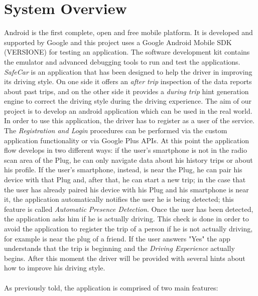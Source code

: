 \chapter{System Overview} \label{chap2}
Android is the first complete, open and free mobile platform. It is developed and supported by Google and this project uses a Google Android Mobile SDK (VERSIONE) for testing an application. The software development kit contains the emulator and advanced debugging tools to run and test the applications.\\
\textit{SafeCar} is an application that has been designed to help the driver in improving its driving style. On one side it offers an \textit{after trip} inspection of the data reports about past trips, and on the other side it provides a \textit{during trip} hint generation engine to correct the driving style during the driving experience.
The aim of our project is to develop an android application which can be used in the real world.\\
In order to use this application, the driver has to register as a user of the service. The \textit{Registration and Login} procedures can be performed via the custom application functionality or via Google Plus APIs.
At this point the application flow develops in two different ways: if the user's smartphone is not in the radio scan area of the Plug, he can only navigate data about his history trips or about his profile. If the user's smartphone, instead,  is near the Plug, he can pair his device with that Plug and, after that, he can start a new trip; in the case that the user has already paired his device with his Plug and his smartphone is near it, the application automatically notifies the user he is being detected; this feature is called \textit{Automatic Presence Detection}. Once the user has been detected, the application asks him if he is actually driving. This check is done in order to avoid the application to register the trip of a person if he is not actually driving, for example is near the plug of a friend. If the user answers "Yes" the app understands that the trip is beginning and the \textit{Driving Experience} actually begins. After this moment the driver will be provided with several hints about how to improve his driving style.\\ \\
As previously told, the application is comprised of two main features:

